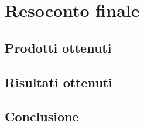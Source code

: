     
\section{Resoconto finale}
    \subsection{Prodotti ottenuti}
    \subsection{Risultati ottenuti}
        
    \subsection{Conclusione}
    

\newpage